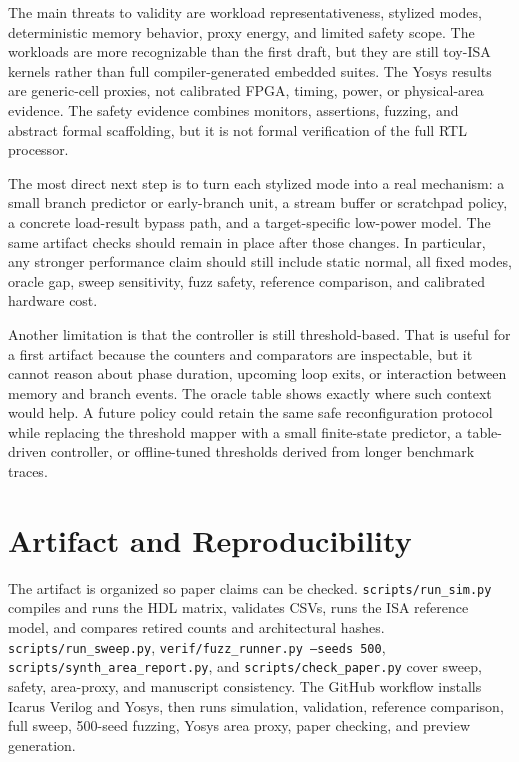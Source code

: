 \documentclass[conference]{IEEEtran}
\begin{document}
The main threats to validity are workload representativeness, stylized modes, deterministic memory behavior, proxy energy, and limited safety scope. The workloads are more recognizable than the first draft, but they are still toy-ISA kernels rather than full compiler-generated embedded suites. The Yosys results are generic-cell proxies, not calibrated FPGA, timing, power, or physical-area evidence. The safety evidence combines monitors, assertions, fuzzing, and abstract formal scaffolding, but it is not formal verification of the full RTL processor.

The most direct next step is to turn each stylized mode into a real mechanism: a small branch predictor or early-branch unit, a stream buffer or scratchpad policy, a concrete load-result bypass path, and a target-specific low-power model. The same artifact checks should remain in place after those changes. In particular, any stronger performance claim should still include static normal, all fixed modes, oracle gap, sweep sensitivity, fuzz safety, reference comparison, and calibrated hardware cost.

Another limitation is that the controller is still threshold-based. That is useful for a first artifact because the counters and comparators are inspectable, but it cannot reason about phase duration, upcoming loop exits, or interaction between memory and branch events. The oracle table shows exactly where such context would help. A future policy could retain the same safe reconfiguration protocol while replacing the threshold mapper with a small finite-state predictor, a table-driven controller, or offline-tuned thresholds derived from longer benchmark traces.

\section{Artifact and Reproducibility}

The artifact is organized so paper claims can be checked. \texttt{scripts/run\_sim.py} compiles and runs the HDL matrix, validates CSVs, runs the ISA reference model, and compares retired counts and architectural hashes. \texttt{scripts/run\_sweep.py}, \texttt{verif/fuzz\_runner.py --seeds 500}, \texttt{scripts/synth\_area\_report.py}, and \texttt{scripts/check\_paper.py} cover sweep, safety, area-proxy, and manuscript consistency. The GitHub workflow installs Icarus Verilog and Yosys, then runs simulation, validation, reference comparison, full sweep, 500-seed fuzzing, Yosys area proxy, paper checking, and preview generation.
\end{document}
